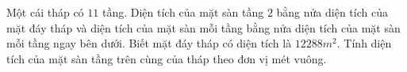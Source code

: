 \begin{bt} [TH] %
	Một cái tháp có $11$ tầng. Diện tích của mặt sàn tầng $2$ bằng nửa diện tích của mặt đáy tháp và diện tích của mặt sàn mỗi tầng bằng nửa diện tích của mặt sàn mỗi tầng ngay bên dưới. Biết mặt đáy tháp có diện tích là $12 288m^2$. Tính diện tích của mặt sàn tầng trên cùng của tháp theo đơn vị mét vuông.
\end{bt}

